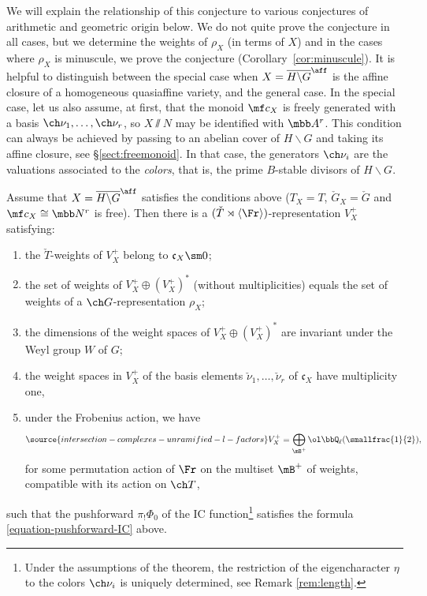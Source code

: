 We will explain the relationship of this conjecture to various conjectures of arithmetic and geometric origin below. We do not quite prove the conjecture in all cases, but we determine the weights of $\rho_X$
(in terms of $X$)
and in the cases where $\rho_X$ is minuscule, we prove the conjecture (Corollary~\ref{cor:minuscule}).
It is helpful to distinguish between the special case when $X = \overline{H\backslash G}^\aff$ is the affine closure of a homogeneous quasiaffine variety, and the general case. In the special case, let us also assume, at first, that
the monoid $\mf c_X$ is freely generated with a basis $\ch\nu_1,\dotsc, \ch\nu_r$, so
$X\sslash N$ may be identified with $\mbb A^r$. This condition can always be achieved by passing to an abelian cover of $H\backslash G$ and taking its affine closure, see \S \ref{sect:freemonoid}. In that case, the generators $\ch\nu_i$ are the valuations associated to the \emph{colors}, that is, the prime $B$-stable divisors of $H\backslash G$.

\begin{thm}
\notready
\label{theorem-affine-closure}
 Assume that $X = \overline{H\backslash G}^\aff$ satisfies the conditions above ($T_X=T$, $\check G_X=\check G$ and $\mf c_X \cong \mbb N^r$ is free). Then there is a $(\check T\rtimes\left<\Fr\right>)$-representation $V^+_X$ satisfying:
 \begin{enumerate}
  \item the $\check T$-weights of $V^+_X$ belong to $\mathfrak c_X\sm 0$;
  \item the set of weights of $V^+_X \oplus (V^+_X)^*$ (without multiplicities) equals the set of weights of a $\ch G$-representation $\rho_X$;
  \item the dimensions of the weight spaces of $V^+_X \oplus (V^+_X)^*$ are invariant under the Weyl group $W$ of $G$;
  \item the weight spaces in $V^+_X$ of the basis elements $\check\nu_1,\dots,\check\nu_r$ of $\mathfrak c_X$ have multiplicity one,
  \item under the Frobenius action, we have
  \begin{equation}\label{e:Frobaction}
\source{intersection-complexes-unramified-l-factors}
   V^+_X= \bigoplus_{\mB^+} \ol\bbQ_\ell (\smallfrac{1}{2}),
\end{equation}
 for some permutation action of $\Fr$ on the multiset $\mB^+$ of weights, compatible with its action on $\ch T$,
\end{enumerate}
 such that the pushforward $\pi_! \Phi_0$ of the IC function\footnote{Under the assumptions of the theorem, the restriction of the eigencharacter $\eta$ to the colors $\ch\nu_i$ is uniquely determined, see Remark \ref{rem:length}.} satisfies the formula \eqref{equation-pushforward-IC} above.
\end{thm}

